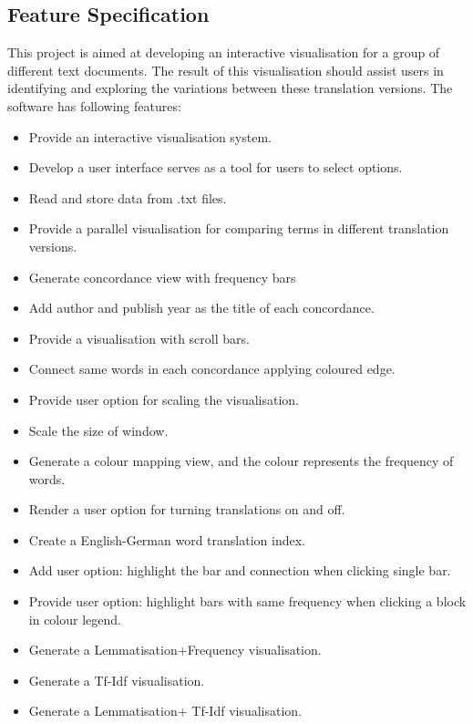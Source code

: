 \subsection{Feature Specification}
This project is aimed at developing an interactive visualisation for a group of different text documents. The result of this visualisation should assist users in identifying and exploring the variations between these translation versions. The software has following features:
\begin{itemize}
	\item \textbf{} Provide an interactive visualisation system.
	\item \textbf{} Develop a user interface serves as a tool for users to select options.
	\item \textbf{} Read and store data from .txt files.
	\item \textbf{} Provide a parallel visualisation for comparing terms in different translation versions.
	\item \textbf{} Generate concordance view with frequency bars
	\item \textbf{} Add author and publish year as the title of each concordance.
	\item \textbf{} Provide a visualisation with scroll bars.
	\item \textbf{} Connect same words in each concordance applying coloured edge.
	\item \textbf{} Provide user option for scaling the visualisation.
	\item \textbf{} Scale the size of window.
	\item \textbf{} Generate a colour mapping view, and the colour represents the frequency of words.
	\item \textbf{} Render a user option for turning translations on and off.
	\item \textbf{} Create a English-German word translation index.
	\item \textbf{} Add user option: highlight the bar and connection when clicking single bar.
	\item \textbf{} Provide user option: highlight bars with same frequency when clicking a block in colour legend.
	\item \textbf{} Generate a Lemmatisation+Frequency visualisation.
	\item \textbf{} Generate a Tf-Idf visualisation.
	\item \textbf{} Generate a Lemmatisation+ Tf-Idf visualisation.
\end{itemize}
